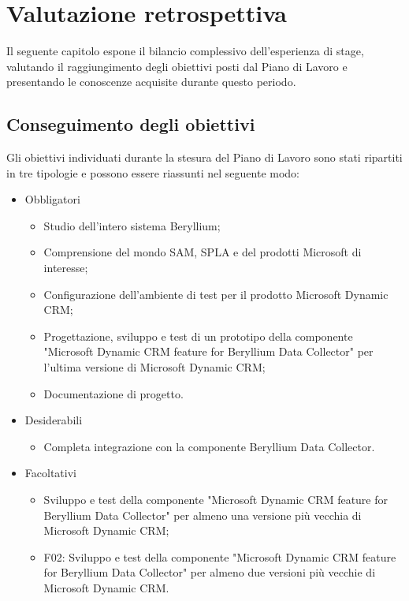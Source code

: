 \chapter{Valutazione retrospettiva}
\label{conclusion}
Il seguente capitolo espone il bilancio complessivo dell’esperienza di stage, valutando il raggiungimento degli obiettivi posti dal Piano di Lavoro e presentando le conoscenze acquisite durante questo periodo.

\section{Conseguimento degli obiettivi}
Gli obiettivi individuati durante la stesura del Piano di Lavoro sono stati ripartiti in tre tipologie e possono essere riassunti nel seguente modo:
\begin{itemize}
    \item Obbligatori
        \begin{itemize}
            \item  Studio dell’intero sistema Beryllium;
            \item Comprensione del mondo SAM, SPLA e del prodotti Microsoft di interesse;
            \item Configurazione dell’ambiente di test per il prodotto Microsoft Dynamic CRM;
            \item Progettazione, sviluppo e test di un prototipo della componente "Microsoft Dynamic CRM
            feature for Beryllium Data Collector" per l’ultima versione di Microsoft Dynamic CRM;
            \item Documentazione di progetto.
        \end{itemize}
    \item Desiderabili
        \begin{itemize}
            \item Completa integrazione con la componente Beryllium Data Collector.
        \end{itemize}
    \item Facoltativi
        \begin{itemize}
            \item  Sviluppo e test della componente "Microsoft Dynamic CRM feature for Beryllium Data Collector" per almeno una versione più vecchia di Microsoft Dynamic CRM;
            \item F02: Sviluppo e test della componente "Microsoft Dynamic CRM feature for Beryllium Data
            Collector" per almeno due versioni più vecchie di Microsoft Dynamic CRM.
        \end{itemize}
\end{itemize}
